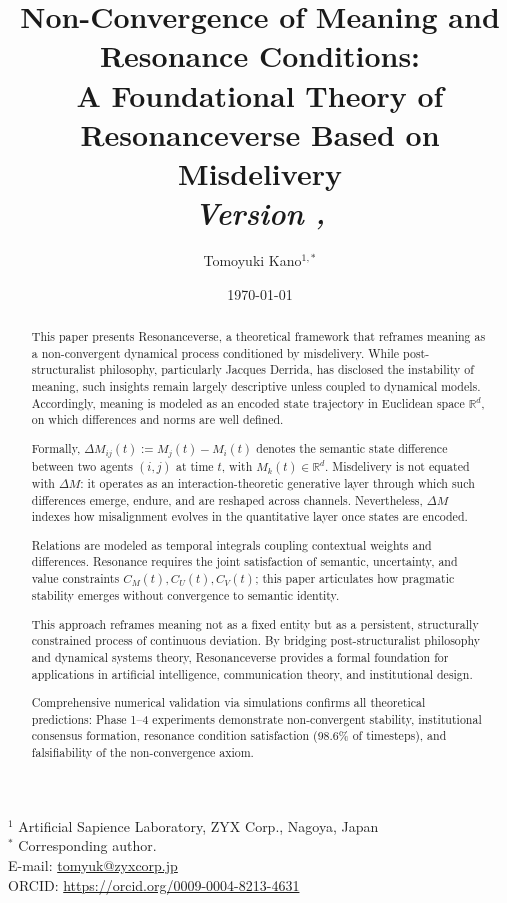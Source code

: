 \documentclass[11pt,a4paper]{article}
\title{Non-Convergence of Meaning and Resonance Conditions:\\
A Foundational Theory of Resonanceverse Based on Misdelivery\\
\large \textit{Version \versionnum, \versiondate}}
\author{%
Tomoyuki Kano$^{1,*}$
}
\date{\today}
\theoremstyle{definition}
\begin{document}
\maketitle

\begin{center}
\small
$^{1}$ Artificial Sapience Laboratory, ZYX Corp., Nagoya, Japan\\
$^{*}$ Corresponding author.\\
E-mail: \url{tomyuk@zyxcorp.jp}\\
ORCID: \url{https://orcid.org/0009-0004-8213-4631}
\end{center}

\vspace{0.5cm}

\begin{abstract}
This paper presents Resonanceverse, a theoretical framework that reframes meaning as a non-convergent dynamical process conditioned by misdelivery. While post-structuralist philosophy, particularly Jacques Derrida, has disclosed the instability of meaning, such insights remain largely descriptive unless coupled to dynamical models. Accordingly, meaning is modeled as an encoded state trajectory in Euclidean space $\mathbb{R}^d$, on which differences and norms are well defined.

Formally, $\Delta M_{ij}(t) := M_j(t) - M_i(t)$ denotes the semantic state difference between two agents $(i, j)$ at time $t$, with $M_k(t) \in \mathbb{R}^d$. Misdelivery is not equated with $\Delta M$: it operates as an interaction-theoretic generative layer through which such differences emerge, endure, and are reshaped across channels. Nevertheless, $\Delta M$ indexes how misalignment evolves in the quantitative layer once states are encoded.

Relations are modeled as temporal integrals coupling contextual weights and differences. Resonance requires the joint satisfaction of semantic, uncertainty, and value constraints $C_M(t), C_U(t), C_V(t)$; this paper articulates how pragmatic stability emerges without convergence to semantic identity.

This approach reframes meaning not as a fixed entity but as a persistent, structurally constrained process of continuous deviation. By bridging post-structuralist philosophy and dynamical systems theory, Resonanceverse provides a formal foundation for applications in artificial intelligence, communication theory, and institutional design.

Comprehensive numerical validation via simulations confirms all theoretical predictions: Phase 1--4 experiments demonstrate non-convergent stability, institutional consensus formation, resonance condition satisfaction (98.6\% of timesteps), and falsifiability of the non-convergence axiom.
\end{abstract}
\end{document}
